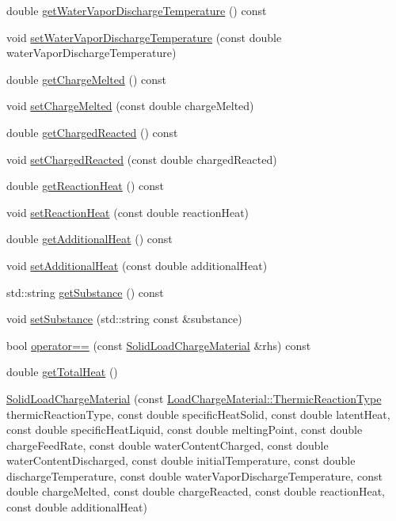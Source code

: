 \begin{DoxyCompactItemize}
\item 
double \hyperlink{class_solid_load_charge_material_a267f26d42f8ba2655c09f561fc0f6cb1}{get\+Water\+Vapor\+Discharge\+Temperature} () const
\item 
void \hyperlink{class_solid_load_charge_material_af7837868e494c16aba5a2c3e1220106d}{set\+Water\+Vapor\+Discharge\+Temperature} (const double water\+Vapor\+Discharge\+Temperature)
\item 
double \hyperlink{class_solid_load_charge_material_ad9ab52fe5861f48b763fe300851df69a}{get\+Charge\+Melted} () const
\item 
void \hyperlink{class_solid_load_charge_material_a9999a2976e8a8662a86cc2a159df5202}{set\+Charge\+Melted} (const double charge\+Melted)
\item 
double \hyperlink{class_solid_load_charge_material_a7c7f05b6ee14eb5f07e5c48c30e9c7a1}{get\+Charged\+Reacted} () const
\item 
void \hyperlink{class_solid_load_charge_material_a38f3b832ff29f779a78a51fd7352fcd4}{set\+Charged\+Reacted} (const double charged\+Reacted)
\item 
double \hyperlink{class_solid_load_charge_material_a3481dc84063babc3514a4173e6bd9341}{get\+Reaction\+Heat} () const
\item 
void \hyperlink{class_solid_load_charge_material_a9c3cd28b2b31fb66eea984d9030cd247}{set\+Reaction\+Heat} (const double reaction\+Heat)
\item 
double \hyperlink{class_solid_load_charge_material_a0fde17a84b10bb75bf78227548fbf26c}{get\+Additional\+Heat} () const
\item 
void \hyperlink{class_solid_load_charge_material_a849fd29a3ecb95be2e9d34f9280b1b94}{set\+Additional\+Heat} (const double additional\+Heat)
\item 
std\+::string \hyperlink{class_solid_load_charge_material_ade525be6bb8cb86405daeb61d45311f9}{get\+Substance} () const
\item 
void \hyperlink{class_solid_load_charge_material_aebe376ab016f48678c3a70390b4ea52a}{set\+Substance} (std\+::string const \&substance)
\item 
bool \hyperlink{class_solid_load_charge_material_aacf2f41ce38067a52fb7d8456a05a699}{operator==} (const \hyperlink{class_solid_load_charge_material}{Solid\+Load\+Charge\+Material} \&rhs) const
\item 
double \hyperlink{class_solid_load_charge_material_af8593eb758c64236a8a026d6145584f4}{get\+Total\+Heat} ()
\item 
\hyperlink{class_solid_load_charge_material_a9145db5518b94cfc1919b8d6ff809f5e}{Solid\+Load\+Charge\+Material} (const \hyperlink{namespace_load_charge_material_a51d4263e865a5d86236622dd3fe23fd1}{Load\+Charge\+Material\+::\+Thermic\+Reaction\+Type} thermic\+Reaction\+Type, const double specific\+Heat\+Solid, const double latent\+Heat, const double specific\+Heat\+Liquid, const double melting\+Point, const double charge\+Feed\+Rate, const double water\+Content\+Charged, const double water\+Content\+Discharged, const double initial\+Temperature, const double discharge\+Temperature, const double water\+Vapor\+Discharge\+Temperature, const double charge\+Melted, const double charge\+Reacted, const double reaction\+Heat, const double additional\+Heat)

\end{DoxyCompactItemize}
